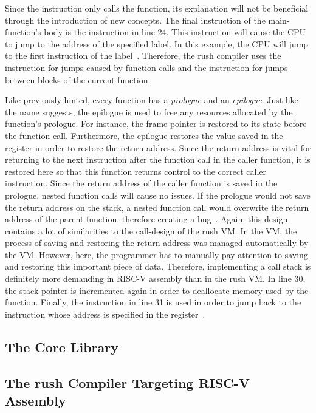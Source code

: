 Since the  instruction only calls the  function, its explanation will not be beneficial through the introduction of new concepts.
The final instruction of the main-function's body is the  instruction in line 24.
This instruction will cause the CPU to jump to the address of the specified label.
In this example, the CPU will jump to the first instruction of the  label~\cite[p.~17]{Patterson2017}.
Therefore, the rush compiler uses the  instruction for jumps caused by function calls and the  instruction for jumps between blocks of the current function.

Like previously hinted, every function has a \emph{prologue} and an \emph{epilogue}.
Just like the name suggests, the epilogue is used to free any resources allocated by the function's prologue.
For instance, the frame pointer is restored to its state before the function call.
Furthermore, the epilogue restores the value saved in the  register in order to restore the return address.
Since the return address is vital for returning to the next instruction after the function call in the caller function, it is restored here so that this function returns control to the correct caller instruction.
Since the return address of the caller function is saved in the prologue, nested function calls will cause no issues.
If the prologue would not save the return address on the stack, a nested function call would overwrite the return address of the parent function, therefore creating a bug~\cite[p.33]{Patterson2017}.
Again, this design contains a lot of similarities to the call-design of the rush VM\@.
In the VM, the process of saving and restoring the return address was managed automatically by the VM\@.
However, here, the programmer has to manually pay attention to saving and restoring this important piece of data.
Therefore, implementing a call stack is definitely more demanding in RISC-V assembly than in the rush VM\@.
In line 30, the stack pointer is incremented again in order to deallocate memory used by the function.
Finally, the  instruction in line 31 is used in order to jump back to the instruction whose address is specified in the  register~\cite[reference]{Patterson2017}.

\subsection{The Core Library}

\subsection{The rush Compiler Targeting RISC-V Assembly}

